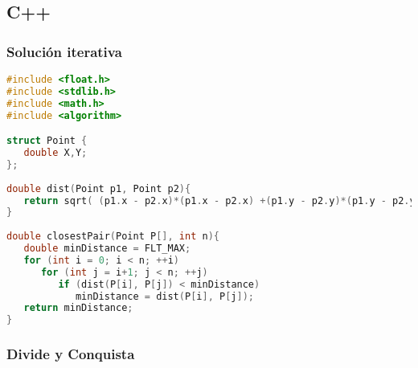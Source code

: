 \subsection{C++}

\subsubsection{Solución iterativa}
\begin{lstlisting}[language=C++]
#include <float.h>
#include <stdlib.h>
#include <math.h>
#include <algorithm>

struct Point {
   double X,Y;
};
	
double dist(Point p1, Point p2){
   return sqrt( (p1.x - p2.x)*(p1.x - p2.x) +(p1.y - p2.y)*(p1.y - p2.y));
}
	
double closestPair(Point P[], int n){
   double minDistance = FLT_MAX;
   for (int i = 0; i < n; ++i)
      for (int j = i+1; j < n; ++j)
         if (dist(P[i], P[j]) < minDistance)
            minDistance = dist(P[i], P[j]);
   return minDistance;
}
\end{lstlisting} 

\subsubsection{Divide y Conquista}

